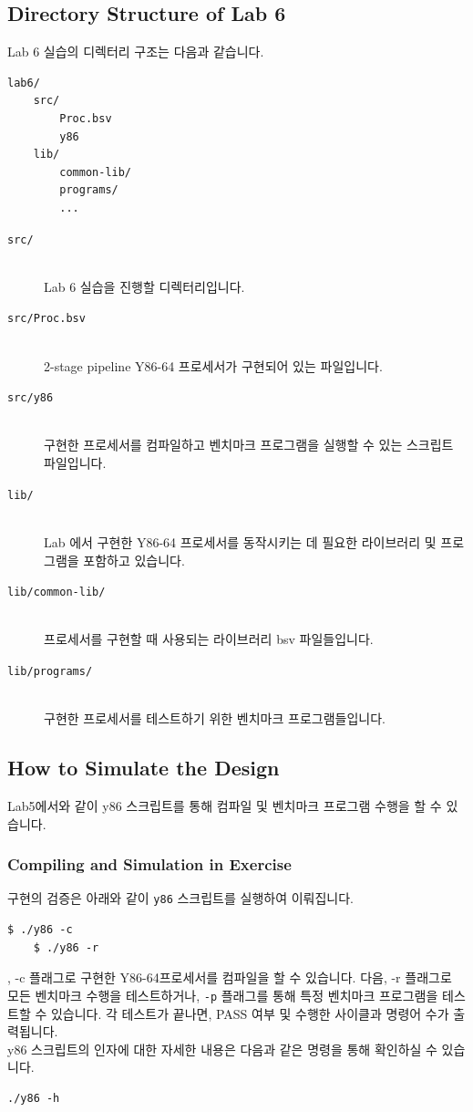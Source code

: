 \documentclass{article}
\begin{document}
\subsection{Directory Structure of Lab 6}
Lab 6 실습의 디렉터리 구조는 다음과 같습니다.

\begin{Verbatim}[frame=single]
lab6/
    src/	
        Proc.bsv
        y86
    lib/
        common-lib/
        programs/
        ...
\end{Verbatim}

\begin{description}
\item [\texttt{src/}]\hfill \ \\
	Lab 6 실습을 진행할 디렉터리입니다.

\item [\texttt{src/Proc.bsv}]\hfill \ \\
	2-stage pipeline Y86-64 프로세서가 구현되어 있는 파일입니다.

\item [\texttt{src/y86}]\hfill \ \\
	구현한 프로세서를 컴파일하고 벤치마크 프로그램을 실행할 수 있는 스크립트 파일입니다.

\item [\texttt{lib/}]\hfill \ \\
	Lab 에서 구현한 Y86-64 프로세서를 동작시키는 데 필요한 라이브러리 및 프로그램을 포함하고 있습니다.

\item [\texttt{lib/common-lib/}]\hfill \ \\
	프로세서를 구현할 때 사용되는 라이브러리 bsv 파일들입니다.

\item [\texttt{lib/programs/}]\hfill \ \\ 
	구현한 프로세서를 테스트하기 위한 벤치마크 프로그램들입니다.

\end{description}

\subsection{How to Simulate the Design}
Lab5에서와 같이 y86 스크립트를 통해 컴파일 및 벤치마크 프로그램 수행을 할 수 있습니다.
\subsubsection{Compiling and Simulation in Exercise}
 구현의 검증은 아래와 같이 \texttt{y86}
 스크립트를 실행하여 이뤄집니다. 
\begin{Verbatim}[frame=single]
    $ ./y86 -c 
    $ ./y86 -r
\end{Verbatim}
, -c 플래그로 구현한 Y86-64프로세서를 컴파일을 할 수 있습니다.
다음, -r 플래그로 모든 벤치마크 수행을 테스트하거나, \texttt{-p} 플래그를 통해 특정 벤치마크 프로그램을 
테스트할 수 있습니다. 각 테스트가 끝나면, PASS 여부 및 수행한 사이클과 명령어 수가 출력됩니다.\\
y86 스크립트의 인자에 대한 자세한 내용은 다음과 같은 명령을 통해 확인하실 수 있습니다.
\
\begin{Verbatim}[frame=single]
./y86 -h
\end{Verbatim}
\end{document}
